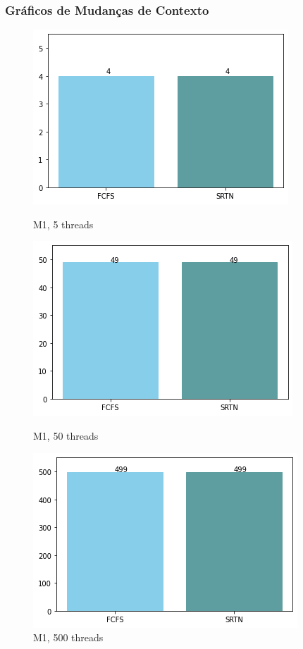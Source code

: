 \documentclass{beamer}
\begin{document}
\begin{frame}
\frametitle{Gráficos de Mudanças de Contexto}


\begin{figure}[!htb]
  \includegraphics[width=\linewidth]{imgs/contex5-1}
  \caption{M1, 5 threads}\label{fig:awesome_image1}
\endminipage\hfill
{}
  \includegraphics[width=\linewidth]{imgs/contex50-1}
  \caption{M1, 50 threads}\label{fig:awesome_image2}
\endminipage\hfill
{}%
  \includegraphics[width=\linewidth]{imgs/contex500-1}
  \caption{M1, 500 threads}\label{fig:awesome_image3}
\endminipage
\end{figure}




\end{frame}
\end{document}
